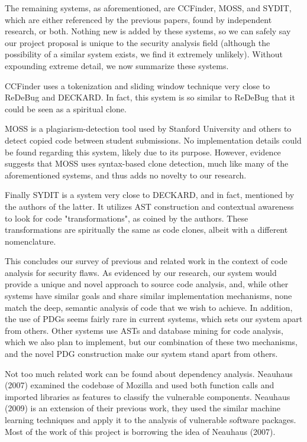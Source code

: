 \documentclass{acm_proc_article-sp}
\begin{document}
The remaining systems, as aforementioned, are CCFinder, MOSS, and SYDIT, which 
are either referenced by the previous papers, found by independent research, or 
both. Nothing new is added by these systems, so we can safely say our project 
proposal is unique to the security analysis field (although the possibility of 
a similar system exists, we find it extremely unlikely). Without expounding 
extreme detail, we now summarize these systems.

CCFinder uses a tokenization and sliding window technique very close to ReDeBug 
and DECKARD. In fact, this system is so similar to ReDeBug that it could be 
seen as a spiritual clone.

MOSS is a plagiarism-detection tool used by Stanford University and others to 
detect copied code between student submissions. No implementation details could 
be found regarding this system, likely due to its purpose. However, evidence 
suggests that MOSS uses syntax-based clone detection, much like many of the 
aforementioned systems, and thus adds no novelty to our research.

Finally SYDIT is a system very close to DECKARD, and in fact, mentioned by the 
authors of the latter. It utilizes AST construction and contextual awareness to 
look for code "transformations", as coined by the authors. These 
transformations are spiritually the same as code clones, albeit with a 
different nomenclature.

This concludes our survey of previous and related work in the context of code 
analysis for security flaws. As evidenced by our research, our system would 
provide a unique and novel approach to source code analysis, and, while other 
systems have similar goals and share similar implementation mechanisms, none 
match the deep, semantic analysis of code that we wish to achieve. In addition, 
the use of PDGs seems fairly rare in current systems, which sets our system 
apart from others. Other systems use ASTs and database mining for code 
analysis, which we also plan to implement, but our combination of these two 
mechanisms, and the novel PDG construction make our system stand apart from 
others.

Not too much related work can be found about dependency analysis. Neauhaus 
(2007) examined the codebase of Mozilla and used both function calls and 
imported libraries as features to classify the vulnerable components. Neauhaus 
(2009) is an extension of their previous work, they used the similar machine 
learning techniques and apply it to the analysis of vulnerable software 
packages. Most of the work of this project is borrowing the idea of Neauhaus 
(2007).
\end{document}
